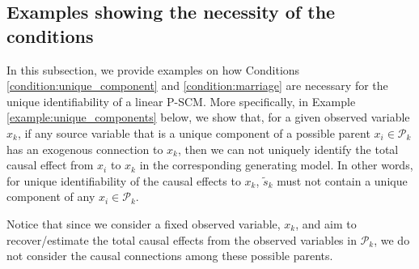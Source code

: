 \documentclass[12pt]{article}
\newcommand{\setP}{\mathcal{P}}
\begin{document}
\subsection{Examples showing the necessity of the conditions} \label{app:example_conditions}
In this subsection, we provide examples on how Conditions \ref{condition:unique_component} and \ref{condition:marriage} are necessary for the unique identifiability of a linear P-SCM. More specifically, in Example \ref{example:unique_components} below, we show that, for a given observed variable $x_k$, if any source variable that is a unique component of a possible parent $x_i\in \setP_k$ has an exogenous connection to $x_k$, then we can not uniquely identify the total causal effect from $x_i$ to $x_k$ in the corresponding generating model. In other words, for unique identifiability of the causal effects to $x_k$, $\tilde{s}_k$ must not contain a unique component of any $x_i\in\mathcal{P}_k$. 

Notice that since we consider a fixed observed variable, $x_k$, and aim to recover/estimate the total causal effects from the observed variables in $\mathcal{P}_k$, we do not consider the causal connections among these possible parents. 
\end{document}
